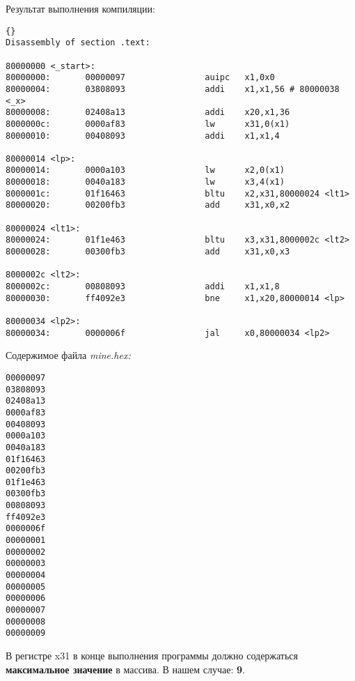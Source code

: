 Результат выполнения компиляции:
\begin{lstlisting}{}
Disassembly of section .text:

80000000 <_start>:
80000000:       00000097                auipc   x1,0x0
80000004:       03808093                addi    x1,x1,56 # 80000038 <_x>
80000008:       02408a13                addi    x20,x1,36
8000000c:       0000af83                lw      x31,0(x1)
80000010:       00408093                addi    x1,x1,4

80000014 <lp>:
80000014:       0000a103                lw      x2,0(x1)
80000018:       0040a183                lw      x3,4(x1)
8000001c:       01f16463                bltu    x2,x31,80000024 <lt1>
80000020:       00200fb3                add     x31,x0,x2

80000024 <lt1>:
80000024:       01f1e463                bltu    x3,x31,8000002c <lt2>
80000028:       00300fb3                add     x31,x0,x3

8000002c <lt2>:
8000002c:       00808093                addi    x1,x1,8
80000030:       ff4092e3                bne     x1,x20,80000014 <lp>

80000034 <lp2>:
80000034:       0000006f                jal     x0,80000034 <lp2>

\end{lstlisting}

Содержимое файла \textit{mine.hex:}
\begin{lstlisting}
00000097
03808093
02408a13
0000af83
00408093
0000a103
0040a183
01f16463
00200fb3
01f1e463
00300fb3
00808093
ff4092e3
0000006f
00000001
00000002
00000003
00000004
00000005
00000006
00000007
00000008
00000009
\end{lstlisting}

В регистре x31 в конце выполнения программы должно содержаться \textbf{максимальное значение} в массива. В нашем случае: \textbf{9}.
